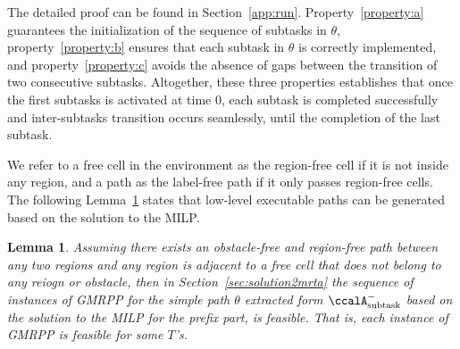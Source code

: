 \documentclass[Afour,sageh,times]{sagej}
\newtheorem{lem}[thm]{Lemma}
\newcommand{\auto}[1]{\ccalA_{\textup{#1}}}
\begin{document}
{{  The detailed proof can be found in Section~\ref{app:run}. Property~\ref{property:a} guarantees the initialization of the sequence of subtasks in $\theta$, property~\ref{property:b} ensures that each subtask in $\theta$ is correctly implemented, and property~\ref{property:c} avoids the absence of gaps between the transition of two consecutive subtasks. Altogether, these three properties establishes that once the first subtasks is activated at time 0, each subtask is completed successfully and inter-subtasks transition occurs seamlessly, until the completion of the last subtask.

We refer to a free cell in the environment as the region-free cell if it is not inside any region, and a path as the label-free path if it only passes region-free cells. The following Lemma~\ref{prop:valid} states that low-level executable paths can be generated based on the solution to the MILP.
 \begin{lem}\label{prop:valid}
   Assuming there exists an obstacle-free and region-free path between any two regions and any region is adjacent to a free cell that does not belong to any reiogn or obstacle, then in Section~\ref{sec:solution2mrta} the sequence of instances of GMRPP  for the simple path $\theta$ extracted form $\auto{subtask}^-$ based on the solution to the MILP for the prefix part, is feasible. That is, each instance of GMRPP is feasible for some $T$'s.
 \end{lem}

}}
\end{document}

